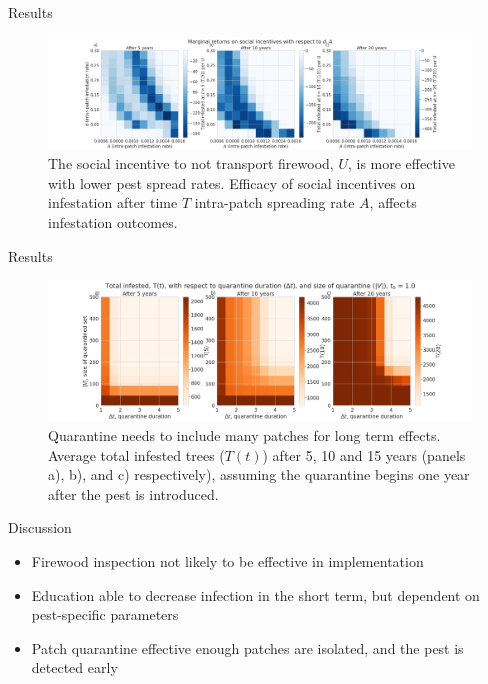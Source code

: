 \documentclass{beamer}
\begin{document}
\begin{frame}{Results}
    \begin{figure}
        \includegraphics[width=\textwidth]{firewood/A_v_ct_v_d_marginal_gain.png}
        \caption{The social incentive to not transport firewood, $U$, is more effective with lower pest spread rates. Efficacy of social incentives on infestation after time $T$ intra-patch spreading rate $A$, affects infestation outcomes.}
    \end{figure}
\end{frame}
\begin{frame}{Results}
    \begin{figure}
        \includegraphics[width=\textwidth]{firewood/node_quarantine_plot_1.0.png}
        \caption{Quarantine needs to include many patches for long term effects. Average total infested trees ($T(t)$) after 5, 10 and 15 years (panels a), b), and c) respectively), assuming the quarantine begins one year after the pest is introduced.}
    \end{figure}
\end{frame}

\begin{frame}{Discussion}
    \begin{itemize}
        \item Firewood inspection not likely to be effective in implementation
        \item Education able to decrease infection in the short term, but dependent on pest-specific parameters
        \item Patch quarantine effective enough patches are isolated, and the pest is detected early
    \end{itemize}
\end{frame}
\end{document}
